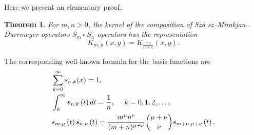 \documentclass[12pt,reqno]{article}
\newtheorem{theorem}{Theorem}
\begin{document}

Here we present an elementary proof.

\begin{theorem}
\label{Thm8} For $m,n> 0$, the kernel of the composition of Sz\'{a}%
sz--Mirakjan--Durrmeyer operators $S_{m}\circ S_{n}$ operators has the
representation 
\begin{equation*}
K_{m,n}\left( x,y\right) =K_{\frac{mn}{m+n}}\left( x,y\right).
\end{equation*}
\end{theorem}

The corresponding well-known formula for the basis functions are 
\begin{align}
& \sum_{k=0}^{\infty }s_{n,k}(x)=1, \nonumber  \\  %
& \int_{0}^{\infty }s_{n,k}\left( t\right) dt=\frac{1}{n}, \text{ \quad }
k=0,1,2,\ldots ,  \label{eq.sm2} \\
& s_{m,\mu }\left( t\right) s_{n,\nu }\left( t\right) =\frac{m^{\mu }n^{\nu
} }{(m+n)^{\mu +\nu }}\binom{\mu +\nu }{\nu }s_{m+n,\mu +\nu }\left(
t\right) .  \label{eq.sm3}
\end{align}
\end{document}
